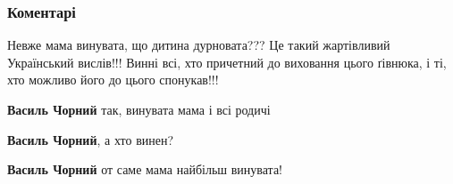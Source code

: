  
 
 
 
 
\subsubsection{Коментарі}
\label{sec:24_08_2021.fb.guskov_igor.1.marsh_veteranov_nezalezhnist.cmt}

\begin{itemize}
 
Невже мама винувата, що дитина дурновата???
Це такий жартівливий Український вислів!!!
Винні всі, хто причетний до виховання цього ґівнюка, і ті, хто можливо його до цього спонукав!!!

\begin{itemize}
 
\textbf{Василь Чорний} так, винувата мама і всі родичі

 
\textbf{Василь Чорний}, а хто винен?

 
\textbf{Василь Чорний} от саме мама найбільш винувата!

 

\end{itemize}
\end{itemize}
